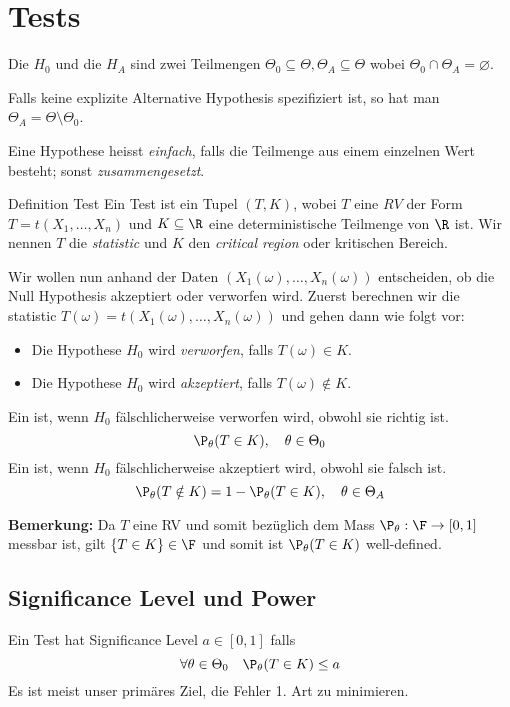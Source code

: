 \section{Tests}
\begin{subbox}{}
	Die  \(H_0\) und die  \(H_A\) sind zwei Teilmengen \(\Theta_0 \subseteq \Theta, \Theta_A \subseteq \Theta\) wobei \(\Theta_0 \cap \Theta_A = \varnothing\). 

	Falls keine explizite Alternative Hypothesis spezifiziert ist, so hat man $\Theta_A = \Theta \setminus \Theta_0$. 

	Eine Hypothese heisst \textit{einfach}, falls die Teilmenge aus einem einzelnen Wert besteht; sonst \textit{zusammengesetzt}.
\end{subbox}

\begin{mainbox}{Definition Test}
	Ein Test ist ein Tupel \((T,K)\), wobei \(T\) eine \(RV\) der Form \(T=t(X_1, \ldots, X_n)\) und \(K \subseteq \R\) eine deterministische Teilmenge von \(\R\) ist. Wir nennen \(T\) die \textit{statistic} und \(K\) den \textit{critical region} oder kritischen Bereich.
\end{mainbox}

Wir wollen nun anhand der Daten \((X_1(\omega), \ldots, X_n(\omega))\) entscheiden, ob die Null Hypothesis akzeptiert oder verworfen wird. Zuerst berechnen wir die statistic \(T(\omega) = t(X_1(\omega), \ldots, X_n(\omega))\) und gehen dann wie folgt vor:
\begin{itemize}
	\item Die Hypothese \(H_0\) wird \textit{verworfen}, falls \(T(\omega) \in K\).
	\item Die Hypothese \(H_0\) wird \textit{akzeptiert}, falls \(T(\omega) \notin K\).
\end{itemize}
\begin{subbox}{}
	Ein  ist, wenn \(H_0\) fälschlicherweise verworfen wird, obwohl sie richtig ist.
	\[\P_\theta(T \in K), \quad \theta \in \Theta_0\]
	\noindent Ein  ist, wenn \(H_0\) fälschlicherweise akzeptiert wird, obwohl sie falsch ist.
	\[\P_\theta(T\notin K) = 1 - \P_\theta(T \in K), \quad \theta \in \Theta_A\]
\end{subbox}
\textbf{Bemerkung: } Da $T$ eine RV und somit bezüglich dem Mass $\P_\theta: \F \to [0,1]$ messbar ist, gilt $\{T \in K\} \in \F$ und somit ist $\P_\theta(T \in K)$ well-defined. 
\subsection{Significance Level und Power}
Ein Test hat Significance Level \(a \in [0,1]\) falls
\[\forall \theta \in \Theta_0 \quad \P_\theta(T \in K) \le a\]
Es ist meist unser primäres Ziel, die Fehler 1. Art zu minimieren.

